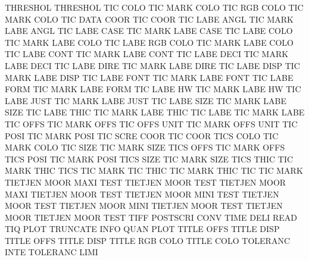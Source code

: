 THRESHOL                                THRESHOL
TIC      COLO                           TIC      MARK COLO
TIC      RGB  COLO                      TIC      MARK COLO
TIC      DATA COOR                      TIC      COOR
TIC      LABE ANGL                      TIC      MARK LABE ANGL
TIC      LABE CASE                      TIC      MARK LABE CASE
TIC      LABE COLO                      TIC      MARK LABE COLO
TIC      LABE RGB  COLO                 TIC      MARK LABE COLO
TIC      LABE CONT                      TIC      MARK LABE CONT
TIC      LABE DECI                      TIC      MARK LABE DECI
TIC      LABE DIRE                      TIC      MARK LABE DIRE
TIC      LABE DISP                      TIC      MARK LABE DISP
TIC      LABE FONT                      TIC      MARK LABE FONT
TIC      LABE FORM                      TIC      MARK LABE FORM
TIC      LABE HW                        TIC      MARK LABE HW
TIC      LABE JUST                      TIC      MARK LABE JUST
TIC      LABE SIZE                      TIC      MARK LABE SIZE
TIC      LABE THIC                      TIC      MARK LABE THIC
TIC      LABE                           TIC      MARK LABE
TIC      OFFS                           TIC      MARK OFFS
TIC      OFFS UNIT                      TIC      MARK OFFS UNIT
TIC      POSI                           TIC      MARK POSI
TIC      SCRE COOR                      TIC      COOR
TICS     COLO                           TIC      MARK COLO
TIC      SIZE                           TIC      MARK SIZE
TICS     OFFS                           TIC      MARK OFFS
TICS     POSI                           TIC      MARK POSI
TICS     SIZE                           TIC      MARK SIZE
TICS     THIC                           TIC      MARK THIC
TICS                                    TIC      MARK
TIC      THIC                           TIC      MARK THIC
TIC                                     TIC      MARK
TIETJEN  MOOR MAXI TEST                 TIETJEN  MOOR TEST
TIETJEN  MOOR MAXI                      TIETJEN  MOOR TEST
TIETJEN  MOOR MINI TEST                 TIETJEN  MOOR TEST
TIETJEN  MOOR MINI                      TIETJEN  MOOR TEST
TIETJEN  MOOR                           TIETJEN  MOOR TEST
TIFF                                    POSTSCRI CONV
TIME     DELI                           READ
TIQ      PLOT                           TRUNCATE INFO QUAN PLOT
TITLE    OFFS                           TITLE    DISP
TITLE    OFFS                           TITLE    DISP
TITLE    RGB  COLO                      TITLE    COLO
TOLERANC INTE                           TOLERANC LIMI
